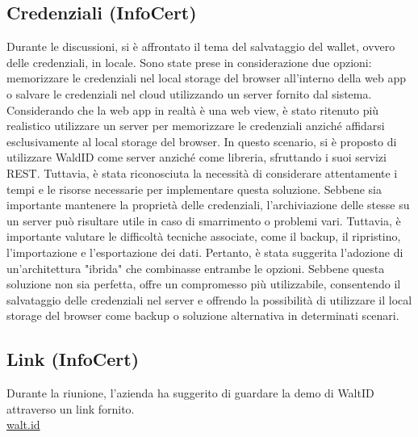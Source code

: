 \subsection{Credenziali (InfoCert)}
Durante le discussioni, si è affrontato il tema del salvataggio del wallet, ovvero delle credenziali, in locale. Sono state prese in considerazione due opzioni: memorizzare le credenziali nel local storage del browser all'interno della web app o salvare le credenziali nel cloud utilizzando un server fornito dal sistema.
Considerando che la web app in realtà è una web view, è stato ritenuto più realistico utilizzare un server per memorizzare le credenziali anziché affidarsi esclusivamente al local storage del browser. In questo scenario, si è proposto di utilizzare WaldID come server anziché come libreria, sfruttando i suoi servizi REST.
Tuttavia, è stata riconosciuta la necessità di considerare attentamente i tempi e le risorse necessarie per implementare questa soluzione. Sebbene sia importante mantenere la proprietà delle credenziali, l'archiviazione delle stesse su un server può risultare utile in caso di smarrimento o problemi vari. Tuttavia, è importante valutare le difficoltà tecniche associate, come il backup, il ripristino, l'importazione e l'esportazione dei dati.
Pertanto, è stata suggerita l'adozione di un'architettura "ibrida" che combinasse entrambe le opzioni. Sebbene questa soluzione non sia perfetta, offre un compromesso più utilizzabile, consentendo il salvataggio delle credenziali nel server e offrendo la possibilità di utilizzare il local storage del browser come backup o soluzione alternativa in determinati scenari.

\subsection{Link (InfoCert)}

Durante la riunione, l'azienda ha suggerito di guardare la demo di WaltID attraverso un link fornito.\\
\href{https://issuer.walt.id/}{walt.id}\\
